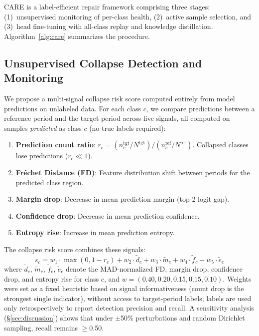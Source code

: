 \documentclass[journal]{IEEEtran}
\newcommand{\ours}{CARE}  %
\begin{document}
\ours{} is a label-efficient repair framework comprising three stages: (1)~unsupervised monitoring of per-class health, (2)~active sample selection, and (3)~head fine-tuning with all-class replay and knowledge distillation.
Algorithm~\ref{alg:care} summarizes the procedure.

\subsection{Unsupervised Collapse Detection and Monitoring}
\label{sec:unsup_detect}

We propose a multi-signal collapse risk score computed entirely from model predictions on unlabeled data.
For each class $c$, we compare predictions between a reference period and the target period across five signals, all computed on samples \textit{predicted} as class $c$ (no true labels required):
\begin{enumerate}
  \item \textbf{Prediction count ratio}: $r_c = (n_c^{\text{tgt}}/N^{\text{tgt}}) / (n_c^{\text{ref}}/N^{\text{ref}})$. Collapsed classes lose predictions ($r_c \ll 1$).
  \item \textbf{Fr\'{e}chet Distance (FD)}: Feature distribution shift between periods for the predicted class region.
  \item \textbf{Margin drop}: Decrease in mean prediction margin (top-2 logit gap).
  \item \textbf{Confidence drop}: Decrease in mean prediction confidence.
  \item \textbf{Entropy rise}: Increase in mean prediction entropy.
\end{enumerate}

The collapse risk score combines these signals:
\begin{equation}
  s_c = w_1 \cdot \max(0, 1{-}r_c) + w_2 \cdot \tilde{d}_c + w_3 \cdot \tilde{m}_c + w_4 \cdot \tilde{f}_c + w_5 \cdot \tilde{e}_c
\end{equation}
where $\tilde{d}_c$, $\tilde{m}_c$, $\tilde{f}_c$, $\tilde{e}_c$ denote the MAD-normalized FD, margin drop, confidence drop, and entropy rise for class $c$, and $w = (0.40, 0.20, 0.15, 0.15, 0.10)$.
Weights were set as a fixed heuristic based on signal informativeness (count drop is the strongest single indicator), without access to target-period labels; labels are used only retrospectively to report detection precision and recall.
A sensitivity analysis (\S\ref{sec:discussion}) shows that under $\pm$50\% perturbations and random Dirichlet sampling, recall remains $\geq$0.50.
\end{document}
